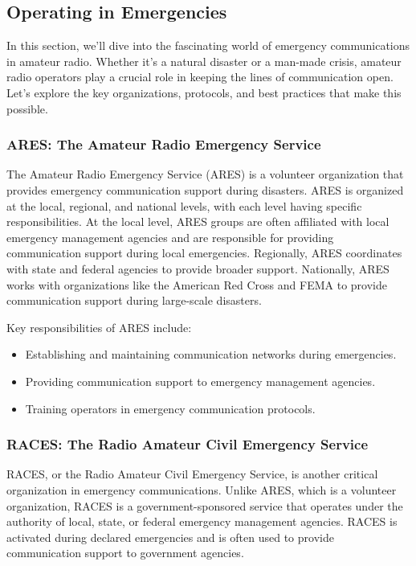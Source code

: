 \subsection{Operating in Emergencies}
\label{subsec:emerg-ops}

In this section, we'll dive into the fascinating world of emergency communications in amateur radio. Whether it's a natural disaster or a man-made crisis, amateur radio operators play a crucial role in keeping the lines of communication open. Let's explore the key organizations, protocols, and best practices that make this possible.

\subsubsection*{ARES: The Amateur Radio Emergency Service}
The Amateur Radio Emergency Service (ARES) is a volunteer organization that provides emergency communication support during disasters. ARES is organized at the local, regional, and national levels, with each level having specific responsibilities. At the local level, ARES groups are often affiliated with local emergency management agencies and are responsible for providing communication support during local emergencies. Regionally, ARES coordinates with state and federal agencies to provide broader support. Nationally, ARES works with organizations like the American Red Cross and FEMA to provide communication support during large-scale disasters.

Key responsibilities of ARES include:
\begin{itemize}[noitemsep]    \item Establishing and maintaining communication networks during emergencies.
    \item Providing communication support to emergency management agencies.
    \item Training operators in emergency communication protocols.
\end{itemize}

\subsubsection*{RACES: The Radio Amateur Civil Emergency Service}
RACES, or the Radio Amateur Civil Emergency Service, is another critical organization in emergency communications. Unlike ARES, which is a volunteer organization, RACES is a government-sponsored service that operates under the authority of local, state, or federal emergency management agencies. RACES is activated during declared emergencies and is often used to provide communication support to government agencies.

